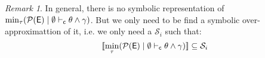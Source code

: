 \documentclass[a4paper]{article}
\theoremstyle{remark}
\newtheorem{remark}{Remark}
\begin{document}
\begin{mathpar}
\end{mathpar}

\begin{remark}
  In general, there is no symbolic representation of $\min_{\tau}(\centail{\pcnstr(\env)}{\emptyset}{\theta\wedge\gamma})$. But we only need to be find a symbolic over-approximattion of it, i.e. we only need a $\mathcal{S}_i$ such that:
  \[
    \sem{\min_{\tau}(\centail{\pcnstr(\env)}{\emptyset}{\theta\wedge\gamma})}
    \subseteq \mathcal{S}_i
  \]
\end{remark}
\end{document}
